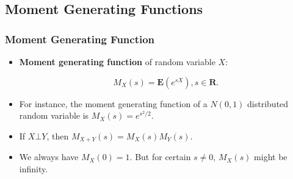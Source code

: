 \documentclass[handout]{beamer}
\newtheorem{Proposition}[theorem]{Proposition}%
\newcommand{\BE}{\mathbf{E}}
\begin{document}
% 
%    
% 
% 
%                 
% 
% 

\subsection{Moment Generating Functions}

\frame
{
  \frametitle{Moment Generating Function} 

   \begin{itemize}
   
                \item<1->\textbf{Moment generating function} of random variable $X$:
                
                $$M_{X}(s)=\BE(e^{sX}), s\in \mathbf{R}.$$

                \item<2-> For instance, the moment generating function of a $N(0,1)$ distributed random variable is $M_X(s)=e^{s^2/2}$.
                
                \item<3-> If $X\bot Y$, then $M_{X+Y} (s)=M_X(s) M_Y(s)$. 
                
                \item<4-> We always have $M_X(0)=1$. But for certain $s\neq 0$, $M_X(s)$ might be infinity. 

\end{itemize}
}
\end{document}
